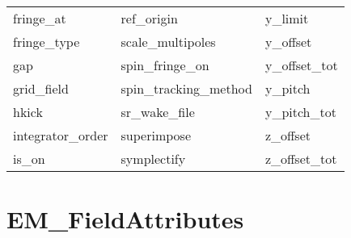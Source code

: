 \begin{tabular}{lll}
fringe_at                   & ref_origin                  & y_limit                     \\
fringe_type                 & scale_multipoles            & y_offset                    \\
gap                         & spin_fringe_on              & y_offset_tot                \\
grid_field                  & spin_tracking_method        & y_pitch                     \\
hkick                       & sr_wake_file                & y_pitch_tot                 \\
integrator_order            & superimpose                 & z_offset                    \\
is_on                       & symplectify                 & z_offset_tot                \\
 \bottomrule
 \end{tabular}
 \vfill
 
 \section{EM_FieldAttributes}
 \label{s:list.em.field}
 
